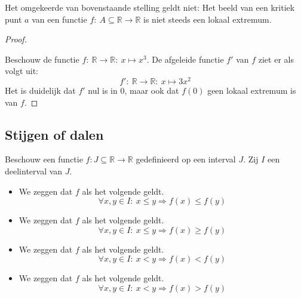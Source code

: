 \documentclass[main.tex]{subfiles}
\begin{document}
\begin{tvb}
  Het omgekeerde van bovenstaande stelling geldt niet:
  Het beeld van een kritiek punt $a$ van een functie $f:\ A \subseteq \mathbb{R} \rightarrow \mathbb{R}$ is niet steeds een lokaal extremum.

  \begin{proof}
    \begin{figure}[H]
      \centering
    \end{figure}
    Beschouw de functie $f:\ \mathbb{R} \rightarrow \mathbb{R}:\ x \mapsto x^{3}$.
    De afgeleide functie $f'$ van $f$ ziet er als volgt uit:
    \[ f':\ \mathbb{R} \rightarrow \mathbb{R}:\ x \mapsto 3x^{2} \]
    Het is duidelijk dat $f'$ nul is in $0$, maar ook dat $f(0)$ geen lokaal extremum is van $f$.
  \end{proof}
\end{tvb}

\subsection{Stijgen of dalen}
\label{sec:stijgen-dalen}

\begin{de}
  Beschouw een functie $f: J \subseteq \mathbb{R} \rightarrow \mathbb{R}$ gedefinieerd op een interval $J$.
  Zij $I$ een deelinterval van $J$.
  \begin{itemize}
  \item We zeggen dat $f$  als het volgende geldt.
    \[ \forall x,y \in I:\ x \le y \Rightarrow f(x) \le f(y) \]
  \item We zeggen dat $f$  als het volgende geldt.
    \[ \forall x,y \in I:\ x \le y \Rightarrow f(x) \ge f(y) \]
  \item We zeggen dat $f$  als het volgende geldt.
    \[ \forall x,y \in I:\ x < y \Rightarrow f(x) < f(y) \]
  \item We zeggen dat $f$  als het volgende geldt.
    \[ \forall x,y \in I:\ x < y \Rightarrow f(x) > f(y) \]
  \end{itemize}
\end{de}
\end{document}
